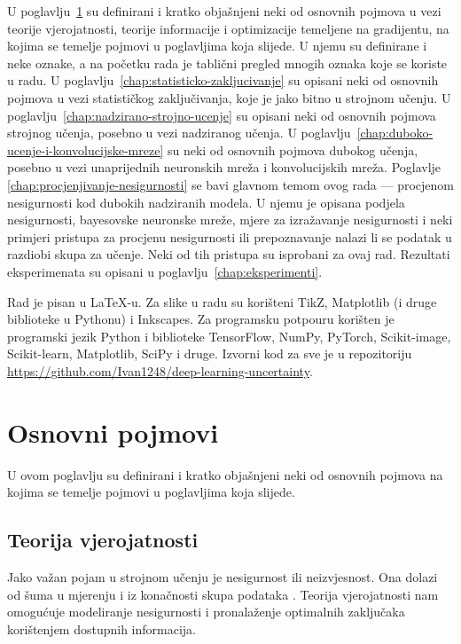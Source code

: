 \documentclass[utf8, diplomski, lmodern]{fer}
\begin{document}
U poglavlju~\ref{chap:osnovni-pojmovi} su definirani i kratko objašnjeni neki od osnovnih pojmova u vezi teorije vjerojatnosti, teorije informacije i optimizacije temeljene na gradijentu, na kojima se temelje pojmovi u poglavljima koja slijede. U njemu su definirane i neke oznake, a na početku rada je tablični pregled mnogih oznaka koje se koriste u radu. 
U poglavlju~\ref{chap:statisticko-zakljucivanje} su opisani neki od osnovnih pojmova u vezi statističkog zaključivanja, koje je jako bitno u strojnom učenju.
U poglavlju~\ref{chap:nadzirano-strojno-ucenje} su opisani neki od osnovnih pojmova strojnog učenja, posebno u vezi nadziranog učenja.
U poglavlju~\ref{chap:duboko-ucenje-i-konvolucijske-mreze} su neki od osnovnih pojmova dubokog učenja, posebno u vezi unaprijednih neuronskih mreža i konvolucijskih mreža.
Poglavlje \ref{chap:procjenjivanje-nesigurnosti} se bavi glavnom temom ovog rada --- procjenom nesigurnosti kod dubokih nadziranih modela. U njemu je opisana podjela nesigurnosti, bayesovske neuronske mreže, mjere za izražavanje nesigurnosti i neki primjeri pristupa za procjenu nesigurnosti ili prepoznavanje nalazi li se podatak u razdiobi skupa za učenje. Neki od tih pristupa \citep{Kendall:2017:WUNBDLCV,Hendrycks:2016:BDMOODE,Liang:2017:PDOODENN} su isprobani za ovaj rad. Rezultati eksperimenata su opisani u poglavlju~\ref{chap:eksperimenti}.

Rad je pisan u \LaTeX-u. Za slike u radu su korišteni TikZ, Matplotlib (i druge biblioteke u Pythonu) i Inkscapes. Za programsku potpouru korišten je programski jezik Python i biblioteke TensorFlow, NumPy, PyTorch, Scikit-image, Scikit-learn, Matplotlib, SciPy i druge. Izvorni kod za sve je u repozitoriju \url{https://github.com/Ivan1248/deep-learning-uncertainty}.


\chapter{Osnovni pojmovi} \label{chap:osnovni-pojmovi}

U ovom poglavlju su definirani i kratko objašnjeni neki od osnovnih pojmova na kojima se temelje pojmovi u poglavljima koja slijede.

\section{Teorija vjerojatnosti}

Jako važan pojam u strojnom učenju je nesigurnost ili neizvjesnost. Ona dolazi od šuma u mjerenju i iz konačnosti skupa podataka \citep{Bishop:2006:PRML}. Teorija vjerojatnosti nam omogućuje modeliranje nesigurnosti i pronalaženje optimalnih zaključaka korištenjem dostupnih informacija.
\end{document}
